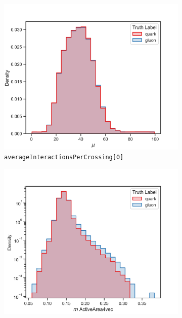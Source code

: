 
\begin{figure}[!htb]
	\centering
	\begin{subfigure}[t]{0.49\textwidth}
		\includegraphics[width=1\textwidth]{src/plots/distributions/highlevel/corrected_averageInteractionsPerCrossing[0].png}
		\caption{\texttt{averageInteractionsPerCrossing[0]}}
		\label{fig:highlevel_0}
	\end{subfigure}
	\begin{subfigure}[t]{0.49\textwidth}
		\includegraphics[width=1\textwidth]{src/plots/distributions/highlevel/jets_ActiveArea4vec_m.png}

\end{subfigure}
\end{figure}
